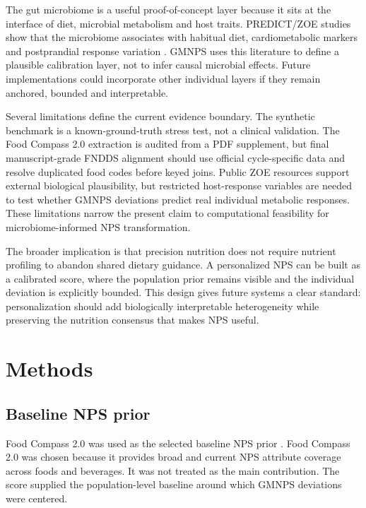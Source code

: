 The gut microbiome is a useful proof-of-concept layer because it sits at the
interface of diet, microbial metabolism and host traits. PREDICT/ZOE studies
show that the microbiome associates with habitual diet, cardiometabolic markers
and postprandial response variation
\cite{berry2020postprandial,asnicar2021microbiome,asnicar2025gut}. GMNPS uses
this literature to define a plausible calibration layer, not to infer causal
microbial effects. Future implementations could incorporate other individual
layers if they remain anchored, bounded and interpretable.

Several limitations define the current evidence boundary. The synthetic
benchmark is a known-ground-truth stress test, not a clinical validation. The
Food Compass 2.0 extraction is audited from a PDF supplement, but final
manuscript-grade FNDDS alignment should use official cycle-specific data and
resolve duplicated food codes before keyed joins. Public ZOE resources support
external biological plausibility, but restricted host-response variables are
needed to test whether GMNPS deviations predict real individual metabolic
responses. These limitations narrow the present claim to computational
feasibility for microbiome-informed NPS transformation.

The broader implication is that precision nutrition does not require nutrient
profiling to abandon shared dietary guidance. A personalized NPS can be built
as a calibrated score, where the population prior remains visible and the
individual deviation is explicitly bounded. This design gives future systems a
clear standard: personalization should add biologically interpretable
heterogeneity while preserving the nutrition consensus that makes NPS useful.

\section*{Methods}

\subsection*{Baseline NPS prior}

Food Compass 2.0 was used as the selected baseline NPS prior
\cite{barrett2024foodcompass2}. Food Compass 2.0 was chosen because it provides
broad and current NPS attribute coverage across foods and beverages. It was not
treated as the main contribution. The score supplied the population-level
baseline around which GMNPS deviations were centered.

